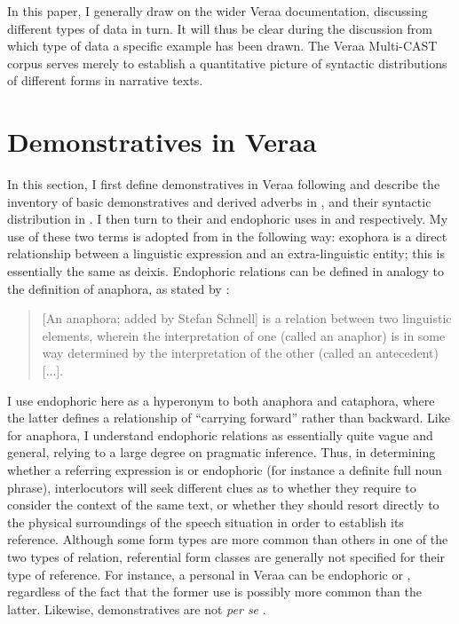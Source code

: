 \documentclass[output=paper
,modfonts
,nonflat]{langsci/langscibook}
\begin{document}
In this paper, I generally draw on the wider Vera{\textquotesingle}a documentation, discussing different types of data in turn. It will thus be clear during the discussion from which type of data a specific example has been drawn. The Vera{\textquotesingle}a Multi-CAST corpus serves merely to establish a quantitative picture of syntactic distributions of different  forms in narrative texts.


\section{Demonstratives in Vera{\textquotesingle}a} \label{section3}
In this section, I first define demonstratives in Vera{\textquotesingle}a following \cite{Himmelmann1996} and describe the inventory of basic demonstratives and derived  adverbs in , and their syntactic distribution in . I then turn to their  and endophoric uses in  and  respectively. My use of these two terms is adopted from \cite[33]{HalidayHasan1976} in the following way: exophora is a direct relationship between a linguistic expression and an extra-linguistic entity; this is essentially the same as deixis. Endophoric relations can be defined in analogy to the definition of anaphora, as stated by \cite[1]{Huang2000}: 

\begin{quote} 
[An anaphora; added by Stefan Schnell] is a relation between two linguistic elements, wherein the interpretation of one (called an anaphor) is in some way determined by the interpretation of the other (called an antecedent) [...].
\end{quote}

\noindent
I use endophoric here as a hyperonym to both anaphora and cataphora, where the latter defines a relationship of ``carrying forward'' rather than backward. Like \cite{Huang2000} for anaphora, I understand endophoric relations as essentially quite vague and general, relying to a large degree on pragmatic inference. Thus, in determining whether a referring expression is  or endophoric (for instance a definite full noun phrase), interlocutors will seek different clues as to whether they require to consider the  context of the same text, or whether they should resort directly to the physical surroundings of the speech situation in order to establish its reference. Although some form types are more common than others in one of the two types of relation, referential form classes are generally not specified for their type of reference. For instance, a personal  in Vera{\textquotesingle}a can be endophoric or , regardless of the fact that the former use is possibly more common than the latter. Likewise, demonstratives are not \emph{per se} . 
\end{document}
